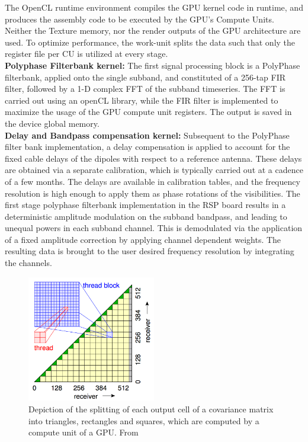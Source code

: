\documentclass{ws-jai}
\begin{document}
The OpenCL  runtime environment  compiles the  GPU kernel  code in  runtime, and
produces the  assembly code to be  executed by the GPU's  Compute Units. Neither
the Texture memory, nor the render outputs  of the GPU architecture are used. To
optimize performance, the work-unit splits the  data such that only the register
file per CU is utilized at every stage.\\

\noindent  \textbf {Polyphase  Filterbank kernel:}  The first  signal processing
block  is  a  PolyPhase  filterbank,   applied  onto  the  single  subband,  and
constituted  of a  256-tap FIR  filter, followed  by a  1-D complex  FFT of  the
subband timeseries.  The FFT is carried  out using an openCL  library, while the
FIR  filter  is implemented  to  maximize  the usage  of  the  GPU compute  unit
registers. The output is saved in the device global memory.\\

\noindent \textbf  {Delay and Bandpass  compensation kernel:} Subsequent  to the
PolyPhase filter bank implementation, a delay compensation is applied to account
for the fixed cable  delays of the dipoles with respect  to a reference antenna.
These delays are obtained via a separate calibration, which is typically carried
out at  a cadence  of a  few months.   The delays  are available  in calibration
tables,  and the  frequency resolution  is high  enough to  apply them  as phase
rotations   of  the   visibilities.   The  first   stage  polyphase   filterbank
implementation in the RSP board  results in a deterministic amplitude modulation
on the subband bandpass, and leading  to unequal powers in each subband channel.
This  is demodulated  via the  application of  a fixed  amplitude correction  by
applying channel  dependent weights. The resulting  data is brought to  the user
desired frequency resolution by integrating the channels.\\

\begin{figure}[htbp]
\centering
\includegraphics[width=0.5\textwidth]{Figs/ACM_spatial_split.png}
\caption {Depiction of the splitting of each output cell of a covariance matrix into triangles, rectangles and squares, which are computed by a compute unit of a GPU. From \cite{romein2016comparison}}
\label{fig:acm_spatial_split}
\end{figure}
\end{document}
